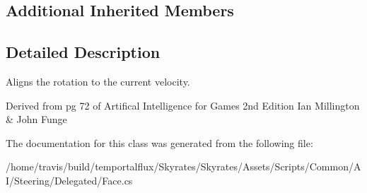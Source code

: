 \subsection*{Additional Inherited Members}


\subsection{Detailed Description}
Aligns the rotation to the current velocity. 

Derived from pg 72 of Artifical Intelligence for Games 2nd Edition Ian Millington \& John Funge 

The documentation for this class was generated from the following file\-:\begin{DoxyCompactItemize}
\item 
/home/travis/build/temportalflux/\-Skyrates/\-Skyrates/\-Assets/\-Scripts/\-Common/\-A\-I/\-Steering/\-Delegated/Face.\-cs\end{DoxyCompactItemize}
